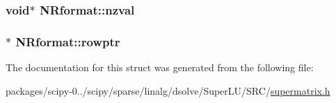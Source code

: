 \subsubsection[{nzval}]{\setlength{\rightskip}{0pt plus 5cm}void$\ast$ N\+Rformat\+::nzval}\label{structNRformat_a3933d6611dc87efede947b08ea8d83f2}
\hypertarget{structNRformat_a552302eb293088d4b7040f487b430ba7}{}
\subsubsection[{rowptr}]{$\ast$ N\+Rformat\+::rowptr}\label{structNRformat_a552302eb293088d4b7040f487b430ba7}


The documentation for this struct was generated from the following file\+:\begin{DoxyCompactItemize}
\item 
packages/scipy-\/0../scipy/sparse/linalg/dsolve/\+Super\+L\+U/\+S\+R\+C/\hyperlink{supermatrix_8h}{supermatrix.\+h}\end{DoxyCompactItemize}
